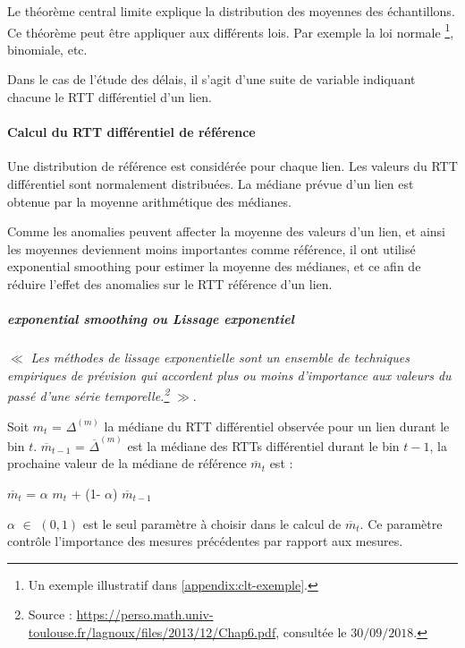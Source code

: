 \documentclass[]{report}
\begin{document}
Le théorème central limite explique la distribution des moyennes des échantillons. Ce théorème peut être appliquer aux différents lois. Par exemple la loi normale \footnote{Un exemple illustratif dans \ref{appendix:clt-exemple}.}, binomiale, etc. 
 


Dans le cas de l'étude des délais, il s'agit d'une suite de variable indiquant chacune le RTT différentiel d'un lien.
 
 \paragraph{Calcul du RTT différentiel de référence}
 Une distribution de référence est considérée pour chaque lien. 
 Les valeurs du RTT différentiel sont normalement distribuées. La médiane prévue d'un lien est obtenue par la moyenne arithmétique des médianes.
 
 Comme les anomalies peuvent affecter la moyenne des valeurs d'un lien, et ainsi les moyennes deviennent moins importantes comme référence,  il ont utilisé exponential smoothing pour estimer la moyenne des médianes, et ce afin de réduire l'effet des anomalies sur le RTT référence d'un lien.
 
 \subparagraph{exponential smoothing ou Lissage exponentiel}
 
$\ll$ \textit{ Les méthodes de lissage exponentielle  sont un ensemble de techniques empiriques de prévision qui accordent plus ou moins d'importance aux valeurs du passé d'une série temporelle.\footnote{Source : \url{https://perso.math.univ-toulouse.fr/lagnoux/files/2013/12/Chap6.pdf}, consultée le $30/09/2018.$}} $\gg$.

Soit $m_t$ = $\Delta^{(m)}$ la médiane du RTT différentiel observée pour un lien durant le bin $t$. $ \overline{m}_{t-1}$ = $ \overline{\Delta}^{(m)}$ est la médiane des  RTTs différentiel  durant le bin $ t-1 $, la prochaine  valeur de la médiane de référence $ \overline{m}_{t}$ est :

$ \overline{m}_{t}$ =  $\alpha$ ${m}_{t}$ + (1-  $\alpha$) $ \overline{m}_{t-1}$

$\alpha$ $\in$ $(0, 1)$ est le seul paramètre à choisir dans le calcul de $ \overline{m}_{t}$.  Ce paramètre contrôle l'importance  des mesures précédentes par rapport aux mesures.
\end{document}
